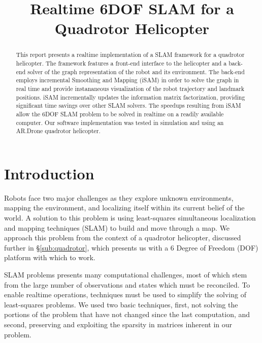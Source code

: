 \documentclass[conference]{IEEEtran}
\title{Realtime 6DOF SLAM for a Quadrotor Helicopter}
\author{\IEEEauthorblockN{Stephen Chaves}
  \and
  \IEEEauthorblockN{Schuyler Cohen}
  \and
  \IEEEauthorblockN{Patrick O'Keefe}
  \and
  \IEEEauthorblockN{Paul Ozog}}
\begin{document}
\maketitle



\begin{abstract}

This report presents a realtime implementation of a SLAM framework for a quadrotor helicopter. 
The framework features a front-end interface to the helicopter and a back-end solver of the graph  
representation of the robot and its environment. The back-end employs incremental Smoothing and Mapping 
(iSAM) in order to solve the graph in real time and provide instananeous visualization of the robot 
trajectory and landmark positions. iSAM incrementally updates the information matrix factorization, providing
significant time savings over other SLAM solvers. The speedups resulting from iSAM allow the 6DOF SLAM problem
to be solved in realtime on a readily available computer. Our software implementation was tested in simulation 
and using an AR.Drone quadrotor helicopter.

\end{abstract}






\section{Introduction}
\label{sec:introduction}

Robots face two major challenges as they explore unknown environments, mapping the
environment, and localizing itself within its current belief of the world.  A solution to
this problem is using least-squares simultaneous localization and mapping techniques
(SLAM) to build and move through a map.  We approach this problem from the context of a
quadrotor helicopter, discussed further in \S\ref{sub:quadrotor}, which presents us
with a 6 Degree of Freedom (DOF) platform with which to work.

SLAM problems presents many computational challenges, most of which stem from the large
number of observations and states which must be reconciled.  To enable realtime
operations, techniques must be used to simplify the solving of least-squares problems. We
used two basic techniques, first, not solving the portions of the problem that have not
changed since the last computation, and second, preserving and exploiting the sparsity in
matrices inherent in our problem.
 
\end{document}
